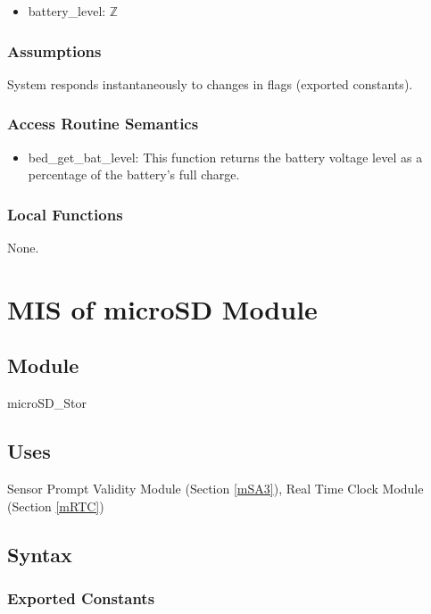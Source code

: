 \documentclass[12pt, titlepage]{article}
\begin{document}
\begin{itemize}
\item battery\_level: $\mathbb{Z}$
\end{itemize}

\subsubsection{Assumptions}

System responds instantaneously to changes in flags (exported constants).

\subsubsection{Access Routine Semantics}

\begin{itemize}
\item bed\_get\_bat\_level: This function returns the battery voltage level as a percentage of the battery's full charge.
\end{itemize}

\subsubsection{Local Functions}
None.

\newpage


\section{MIS of microSD Module} \label{mDS_1} 

\subsection{Module}

microSD\_Stor

\subsection{Uses}

Sensor Prompt Validity Module (Section \ref{mSA3}), Real Time Clock Module (Section \ref{mRTC})    %

\subsection{Syntax}

\subsubsection{Exported Constants}
\end{document}

